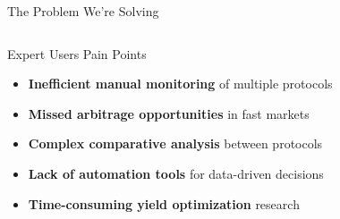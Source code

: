 \documentclass[aspectratio=169]{beamer}
\providecommand{\faMissed}{\faTimesCircle}
\providecommand{\faSearchDollar}{\faDollarSign}
\begin{document}
\begin{frame}{The Problem We're Solving}
\begin{columns}[c]
\begin{block}{Expert Users Pain Points}
\vspace{0.05cm}
\begin{itemize}
\setlength\itemsep{-0.1em}
\setlength\leftmargin{1em}
\item[\color{secondary}\faClock] \textbf{Inefficient manual monitoring} of multiple protocols
\item[\color{secondary}\faMissed] \textbf{Missed arbitrage opportunities} in fast markets
\item[\color{secondary}\faChartBar] \textbf{Complex comparative analysis} between protocols
\item[\color{secondary}\faRobot] \textbf{Lack of automation tools} for data-driven decisions
\item[\color{secondary}\faSearchDollar] \textbf{Time-consuming yield optimization} research
\end{itemize}
\vspace{0.05cm}
\end{block}
\end{columns}

\vspace{0.05cm}
\begin{center}
\end{center}
\end{frame}
\end{document}

